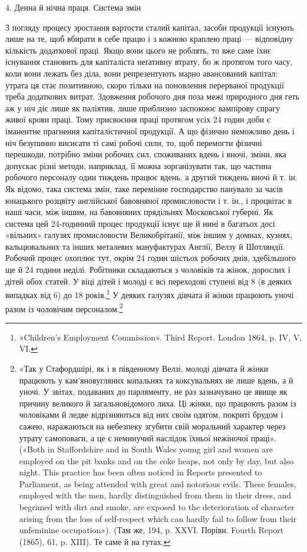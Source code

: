4. Денна й нічна праця. Система змін

З погляду процесу зростання вартости сталий капітал, засоби
продукції існують лише на те, щоб вбирати в себе працю і з кожною
краплею праці — відповідну кількість додаткової праці.
Якщо вони цього не роблять, то вже саме їхнє існування становить
для капіталіста неґативну втрату, бо ж протягом того часу,
коли вони лежать без діла, вони репрезентують марно авансований
капітал: утрата ця стає позитивною, скоро тільки на поновлення
перерваної продукції треба додаткових витрат. Здовження
робочого дня поза межі природного дня геть аж у ніч діє
лише як паліятив, лише приблизно заспокоює вампірову спрагу
живої крови праці. Тому присвоєння праці протягом усіх 24 годин
доби є іманентне прагнення капіталістичної продукції. А що
фізично неможливо день і ніч безупинно висисати ті самі робочі
сили, то, щоб перемогти фізичні перешкоди, потрібно зміни робочих
сил, споживаних вдень і вночі, зміни, яка допускає різні
методи, наприклад, її можна зорганізувати так, що частина робочого
персоналу один тиждень працює вдень, а другий тиждень
вночі й т. ін. Як відомо, така система змін, таке перемінне господарство
панувало за часів юнацького розцвіту англійської бавовняної
промисловости і т. ін., і процвітає в наші часи, між
іншим, на бавовняних прядільнях Московської губерні. Як система
цей 24-годинний процес продукції існує ще й нині в багатьох
досі «вільних» галузях промисловости Великобрітанії, між іншим
у домнах, кузнях, вальцювальних та інших металевих мануфактурах
Англії, Велзу й Шотляндії. Робочий процес охоплює тут,
окрім 24 годин шістьох робочих днів, здебільшого ще й 24 години
неділі. Робітники складаються з чоловіків та жінок, дорослих
і дітей обох статей. У віці дітей і молоді є всі переходові ступені
від 8 (в деяких випадках від 6) до 18 років.\footnote{
«Children’s Employment Commission». Third Report. London
1864, p. IV, V, VI.
} У деяких галузях
дівчата й жінки працюють уночі разом із чоловічим персоналом.\footnote{
«Так у Стафордшірі, як і в південному Велзі, молоді дівчата й жінки
працюють у кам’яновугляних копальнях та коксувальнях не лише вдень,
а й уночі. У звітах, подаваних до парляменту, не раз зазначувано це
явище як причину великого й загальновідомого лиха. Ці жінки, що працюють
разом із чоловіками й ледве відрізняються від них своїм одягом,
покриті брудом і сажею, наражаються на небезпеку згубити свій моральний
характер через утрату самоповаги, а це є неминучий наслідок їхньої
нежіночої праці». («Both in Staffordshire and in South Wales young girl
and women are employed on the pit banks and on the coke heaps, not only
by day, but also night. This practice has been often noticed in Reports presented
to Parliament, as being attended with great and notorious evils.
These females, employed with the men, hardly distinguished from them
in their dress, and begrimed with dirt and smoke, are exposed to the deterioration
of character arising from the loss of self-respect which can hardly
fail to follow from their unfeminine occupation»). (Там же, 194, p. XXVI.
Порівн. Fourth Report (1865), 61, p. XIII). Те саме й на гутах.
}